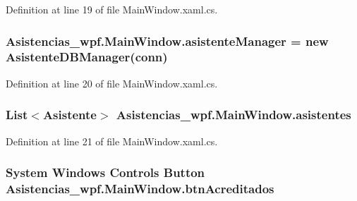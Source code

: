 Definition at line 19 of file Main\-Window.\-xaml.\-cs.

\hypertarget{class_asistencias__wpf_1_1_main_window_a0b088adb7d4ae4110408a09fbdbfaa18}{
\subsubsection[{asistente\-Manager}]{ Asistencias\-\_\-wpf.\-Main\-Window.\-asistente\-Manager = new {\bf Asistente\-D\-B\-Manager}({\bf conn})\hspace{0.3cm}{\ttfamily [private]}}}\label{class_asistencias__wpf_1_1_main_window_a0b088adb7d4ae4110408a09fbdbfaa18}


Definition at line 20 of file Main\-Window.\-xaml.\-cs.

\hypertarget{class_asistencias__wpf_1_1_main_window_a9460d841a29658f63dd55788a1f3e3dd}{
\subsubsection[{asistentes}]{\setlength{\rightskip}{0pt plus 5cm}List$<${\bf Asistente}$>$ Asistencias\-\_\-wpf.\-Main\-Window.\-asistentes\hspace{0.3cm}{\ttfamily [private]}}}\label{class_asistencias__wpf_1_1_main_window_a9460d841a29658f63dd55788a1f3e3dd}


Definition at line 21 of file Main\-Window.\-xaml.\-cs.

\hypertarget{class_asistencias__wpf_1_1_main_window_a926b718586c2787f19ddaa4001911d1b}{
\subsubsection[{btn\-Acreditados}]{\setlength{\rightskip}{0pt plus 5cm}System Windows Controls Button Asistencias\-\_\-wpf.\-Main\-Window.\-btn\-Acreditados\hspace{0.3cm}{\ttfamily [package]}}}\label{class_asistencias__wpf_1_1_main_window_a926b718586c2787f19ddaa4001911d1b}



